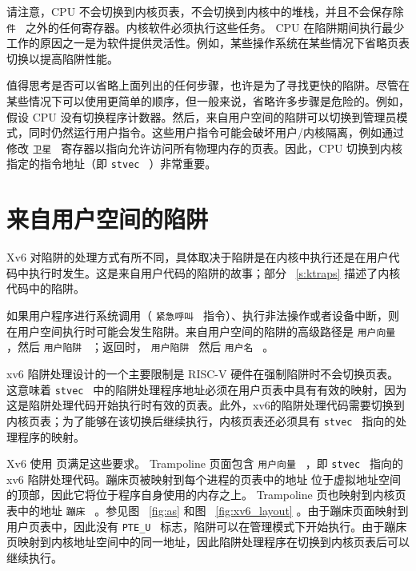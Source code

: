 \documentclass[UTF8]{article}
\begin{document}
请注意，CPU 不会切换到内核页表，不会切换到内核中的堆栈，并且不会保存除  {    \tt    件   }  之外的任何寄存器。内核软件必须执行这些任务。 CPU 在陷阱期间执行最少工作的原因之一是为软件提供灵活性。例如，某些操作系统在某些情况下省略页表切换以提高陷阱性能。  

值得思考是否可以省略上面列出的任何步骤，也许是为了寻找更快的陷阱。尽管在某些情况下可以使用更简单的顺序，但一般来说，省略许多步骤是危险的。例如，假设 CPU 没有切换程序计数器。然后，来自用户空间的陷阱可以切换到管理员模式，同时仍然运行用户指令。这些用户指令可能会破坏用户/内核隔离，例如通过修改  {    \tt    卫星   }  寄存器以指向允许访问所有物理内存的页表。因此，CPU 切换到内核指定的指令地址（即  {    \tt    stvec   }  ）非常重要。  

   \section{来自用户空间的陷阱  }     

Xv6 对陷阱的处理方式有所不同，具体取决于陷阱是在内核中执行还是在用户代码中执行时发生。这是来自用户代码的陷阱的故事；部分~    \ref{s:ktraps}    描述了内核代码中的陷阱。  

如果用户程序进行系统调用（ {    \tt    紧急呼叫   }  指令）、执行非法操作或者设备中断，则在用户空间执行时可能会发生陷阱。来自用户空间的陷阱的高级路径是
  {    \tt    用户向量   } 
       ，然后  {    \tt    用户陷阱   } 
        ；返回时，
  {    \tt    用户陷阱   } 
        然后
  {    \tt    用户名   } 
        。  

xv6 陷阱处理设计的一个主要限制是 RISC-V 硬件在强制陷阱时不会切换页表。这意味着  {    \tt    stvec   }  中的陷阱处理程序地址必须在用户页表中具有有效的映射，因为这是陷阱处理代码开始执行时有效的页表。此外，xv6的陷阱处理代码需要切换到内核页表；为了能够在该切换后继续执行，内核页表还必须具有  {    \tt    stvec   }  指向的处理程序的映射。  

Xv6 使用        页满足这些要求。 Trampoline 页面包含  {    \tt    用户向量   }  ，即  {    \tt    stvec   }  指向的 xv6 陷阱处理代码。蹦床页被映射到每个进程的页表中的地址
        位于虚拟地址空间的顶部，因此它将位于程序自身使用的内存之上。 Trampoline 页也映射到内核页表中的地址  {    \tt    蹦床   } 。参见图~    \ref{fig:as}    和图~    \ref{fig:xv6_layout}    。由于蹦床页面映射到用户页表中，因此没有  {    \tt    PTE\_U   }  标志，陷阱可以在管理模式下开始执行。由于蹦床页映射到内核地址空间中的同一地址，因此陷阱处理程序在切换到内核页表后可以继续执行。  
\end{document}

